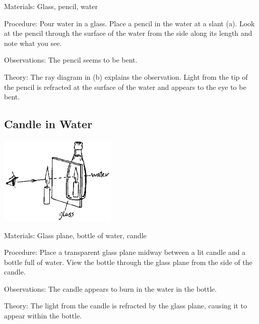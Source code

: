 \begin{multicols}{2}
\begin{description*}
\item[Materials:]{Glass, pencil, water}
\item[Procedure:]{Pour water in a glass. Place a pencil in the water at a slant (a). Look at the pencil through the surface of the water from the side along its length and note what you see.}
\item[Observations:]{The pencil seems to be bent.}
\item[Theory:]{The ray diagram in (b) explains the observation. Light from the tip of the pencil is refracted at the surface of the water and appears to the eye to be bent.}
\end{description*}

\subsection{Candle in Water}

\begin{center}
\includegraphics[width=0.42\textwidth]{./img/source/candle-in-water.png}
\end{center}

\begin{description*}
\item[Materials:]{Glass plane, bottle of water, candle}
\item[Procedure:]{Place a transparent glass plane midway between a lit candle and a bottle full of water. View the bottle through the glass plane from the side of the candle.}
\item[Observations:]{The candle appears to burn in the water in the bottle.}
\item[Theory:]{The light from the candle is refracted by the glass plane, causing it to appear within the bottle.}
\end{description*}


\end{multicols}
